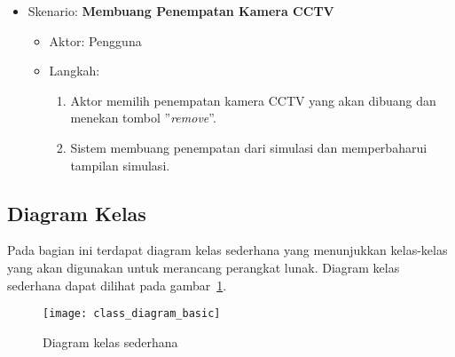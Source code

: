 \begin{itemize}
	\item Skenario: \textbf{Membuang Penempatan Kamera CCTV}
	\begin{itemize}
		\item Aktor: Pengguna
		\item Langkah:
		\begin{enumerate}
			\item Aktor memilih penempatan kamera CCTV yang akan dibuang dan menekan tombol ''\textit{remove}''.
			\item Sistem membuang penempatan dari simulasi dan memperbaharui tampilan simulasi.
		\end{enumerate}
	\end{itemize}
\end{itemize}

\subsection{Diagram Kelas}
Pada bagian ini terdapat diagram kelas sederhana yang menunjukkan kelas-kelas yang akan digunakan untuk merancang perangkat lunak. Diagram kelas sederhana dapat dilihat pada gambar~\ref{fig:class_diagram_basic}.

\begin{figure}[h]
	\centering  
	\texttt{[image: class\_diagram\_basic]}
	\caption[Diagram kelas sederhana]{Diagram kelas sederhana}
	\label{fig:class_diagram_basic}
\end{figure}